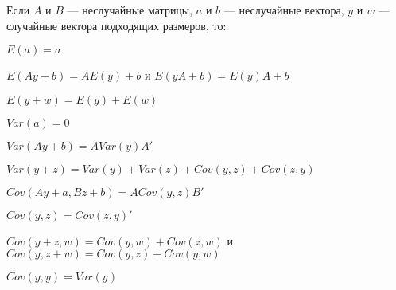 \documentclass[]{article}
\begin{document}
Если $A$ и $B$ --- неслучайные матрицы, $a$ и $b$ --- неслучайные
вектора, $y$ и $w$ --- случайные вектора подходящих размеров, то:

$E(a)=a$

$E(Ay+b)=AE(y)+b$ и $E(yA+b)=E(y)A+b$

$E(y+w)=E(y)+E(w)$

$Var(a)=0$

$Var(Ay+b)=AVar(y)A'$

$Var(y+z)=Var(y)+Var(z)+Cov(y,z)+Cov(z,y)$

$Cov(Ay+a,Bz+b)=ACov(y,z)B'$

$Cov(y,z)=Cov(z,y)'$

$Cov(y+z,w)=Cov(y,w)+Cov(z,w)$ и $Cov(y,z+w)=Cov(y,z)+Cov(y,w)$

$Cov(y,y)=Var(y)$
\end{document}
